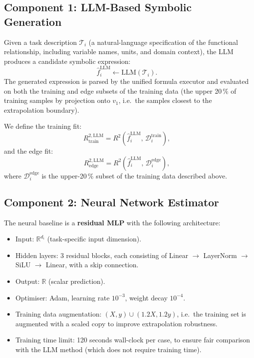 \documentclass[twoside,11pt]{article}
\newcommand{\Rsq}{R^{2}}
\begin{document}
\subsection{Component 1: LLM-Based Symbolic Generation}\label{subsec:component-1-llmbased-symbolic-generation}
\label{sec:llm_gen}

Given a task description $\mathcal{T}_i$ (a natural-language specification of the
functional relationship, including variable names, units, and domain context),
the LLM produces a candidate symbolic expression:
\begin{equation}
  \hat{f}^{\mathrm{LLM}}_i \leftarrow \mathrm{LLM}(\mathcal{T}_i).
  \label{eq:llm_gen}
\end{equation}
The generated expression is parsed by the unified formula executor and evaluated
on both the training and edge subsets of the training data (the upper 20\,\%
of training samples by projection onto $v_1$, i.e.\ the samples closest to the
extrapolation boundary).

We define the training fit:
\begin{equation}
  {R^{2,\mathrm{LLM}}_{\mathrm{train}}} = \Rsq\!\left(\hat{f}^{\mathrm{LLM}}_i,\,
  \mathcal{D}^{\mathrm{train}}_i\right),
  \label{eq:r2_train_llm}
\end{equation}
and the edge fit:
\begin{equation}
  {R^{2,\mathrm{LLM}}_{\mathrm{edge}}} = \Rsq\!\left(\hat{f}^{\mathrm{LLM}}_i,\,
  \mathcal{D}^{\mathrm{edge}}_i\right),
  \label{eq:r2_edge_llm}
\end{equation}
where $\mathcal{D}^{\mathrm{edge}}_i$ is the upper-20\,\% subset of the training
data described above.

\subsection{Component 2: Neural Network Estimator}\label{subsec:component-2-neural-network-estimator}
\label{sec:nn}

The neural baseline is a \textbf{residual MLP} with the following architecture:
\begin{itemize}
  \item Input: $\mathbb{R}^{d_i}$ (task-specific input dimension).
  \item Hidden layers: 3 residual blocks, each consisting of Linear $\to$
    LayerNorm $\to$ SiLU $\to$ Linear, with a skip connection.
  \item Output: $\mathbb{R}$ (scalar prediction).
  \item Optimiser: Adam, learning rate $10^{-3}$, weight decay $10^{-4}$.
  \item Training data augmentation: $(X, y) \cup (1.2X, 1.2y)$, i.e.\ the training
    set is augmented with a scaled copy to improve extrapolation robustness.
  \item Training time limit: 120 seconds wall-clock per case, to ensure
    fair comparison with the LLM method (which does not require training time).
\end{itemize}
\end{document}
